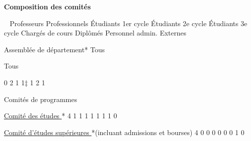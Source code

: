 \documentclass [12 pt]{article}
\begin{document}
                
                    
                
            
            
        \textbf{
        Composition des comités
        }
    
            
                
                    
                        
                             
                            Professeurs
                            Professionnels
                            Étudiants 1er cycle
                            Étudiants 2e cycle
                            Étudiants 3e cycle
                            Chargés de cours
                            Diplômés
                            Personnel admin.
                            Externes
                        
                        
                            Assemblée de département*
                            Tous
                            
                                Tous
                            
                            0
                            2
                            1
                            1‡
                            1
                            2
                            1
                        
                        
                            Comités de programmes
                        
                        
                            
        \href{
        https://wiki.umontreal.ca/pages/viewpage.action?pageId=124095459#coet
        } {
        Comité des études
        }
    *
                            4
                            1
                            1
                            1
                            1
                            1
                            1
                            1
                            0
                        
                        
                            
        \href{
        https://wiki.umontreal.ca/pages/viewpage.action?pageId=124095459#coetsup
        } {
        Comité d'études supérieures
        }
    *(incluant
                                admissions et bourses)
                            4
                            0
                            0
                            0
                            0
                            0
                            0
                            1
                            0
                        
\end{document}

